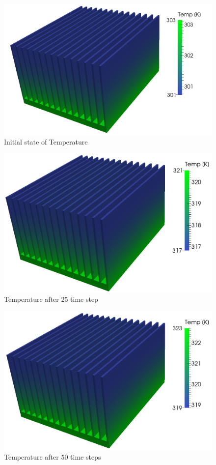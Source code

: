 \documentclass[12pt]{article}
\begin{document}
	\begin{figure}[H]
    \includegraphics[scale=0.3]{sink-MPI/heatSink_mpi_ts1.png}
    \centering
    \caption{Initial state of Temperature}
	\end{figure}	
	\begin{figure}[H]
    \includegraphics[scale=0.3]{sink-MPI/heatSink_mpi_ts25.png}
    \centering
    \caption{Temperature after 25 time step}
	\end{figure}	
	\begin{figure}[H]
    \includegraphics[scale=0.3]{sink-MPI/heatSink_mpi_ts50.png}
    \centering
    \caption{Temperature after 50 time steps}
	\end{figure}	
\end{document}
